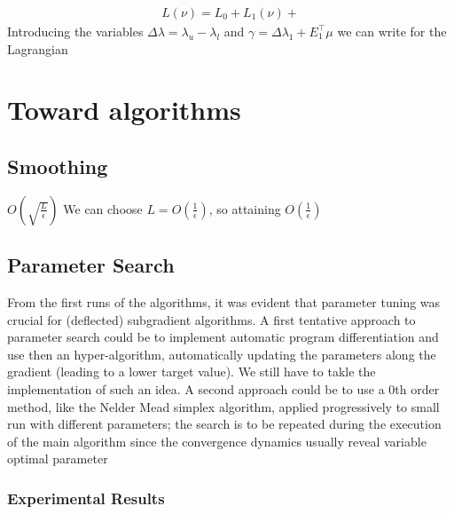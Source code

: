 \documentclass[twoside]{mfitjournal}
\begin{document}
\begin{gather*}
L(\nu) = L_0 + L_1(\nu) +
\end{gather*}
Introducing the variables $\Delta \lambda = \lambda_u - \lambda_l$ and $\gamma = \Delta\lambda_1 + E_1^\intercal\mu$ we can write for the Lagrangian

\section*{Toward algorithms}
\subsection*{Smoothing}
$O(\sqrt{\frac{L}{\epsilon}})$
We can choose $L = O(\frac{1}{\epsilon})$, so attaining
$O(\frac{1}{\epsilon})$
\subsection*{Parameter Search}
From the first runs of the algorithms, it was evident that parameter tuning was
crucial for (deflected) subgradient algorithms.
A first tentative approach to parameter search could be
to implement automatic program differentiation and use then an hyper-algorithm,
automatically updating the parameters along the gradient (leading to a lower
target value). We still have to takle the implementation of such an idea.
A second approach could be to use a 0th order method, like the Nelder Mead simplex
algorithm, applied progressively to small run with different parameters;
the search is to be repeated during the execution of the main algorithm since the
convergence dynamics usually reveal variable optimal parameter
\subsubsection*{Experimental Results}
\subsubsubsection*{}
\end{document}
